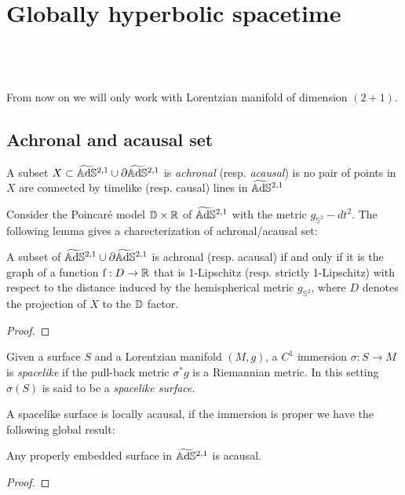 \chapter{Globally hyperbolic spacetime}\label{chapter:4}

\\
\\
\\
From now on we will only work with Lorentzian manifold of dimension $(2+1)$.

\section{Achronal and acausal set}

\begin{definition}
    A subset $X \subset \widetilde{\mathbb{A}\mathrm{d}\mathbb{S}}{}^{2,1} \cup \partial\widetilde{\mathbb{A}\mathrm{d}\mathbb{S}}{}^{2,1}$ is \textit{achronal} (resp. \textit{acausal}) is no pair of points in $X$ are connected by timelike (resp. causal) lines in $\widetilde{\mathbb{A}\mathrm{d}\mathbb{S}}{}^{2,1}$
\end{definition}
Consider the Poincaré model $\mathbb{D}\times\mathbb{R}$ of $\widetilde{\mathbb{A}\mathrm{d}\mathbb{S}}{}^{2,1}$ with the metric $g_{\mathbb{S}^2} - dt^2$. The following lemma gives a charecterization of achronal/acausal set:
\begin{lemma}
    A subset of $\widetilde{\mathbb{A}\mathrm{d}\mathbb{S}}{}^{2,1} \cup \partial\widetilde{\mathbb{A}\mathrm{d}\mathbb{S}}{}^{2,1}$ is achronal (resp. acausal) if and only if it is the graph of a function $\text{f} : D \to \mathbb{R}$ that is 1-Lipschitz (resp. strictly 1-Lipschitz) with respect to the distance induced by the hemispherical metric $g_{\mathbb{S}^2}$, where $D$ denotes the projection of $X$ to the $\mathbb{D}$ factor.
\end{lemma} 
\begin{proof}
\end{proof}

\begin{definition}
    Given a surface $S$ and a Lorentzian manifold $(M,g)$, a $C^1$ immersion $\sigma : S \to M$ is \textit{spacelike} if the pull-back metric $\sigma^* g$ is a Riemannian metric. In this setting $\sigma(S)$ is said to be a \textit{spacelike surface}.
\end{definition}
A spacelike surface is locally acausal, if the immersion is proper we have the following global result:
\begin{lemma}
    Any properly embedded surface in $\widetilde{\mathbb{A}\mathrm{d}\mathbb{S}}{}^{2,1}$ is acausal.
\end{lemma}
\begin{proof}
\end{proof}

